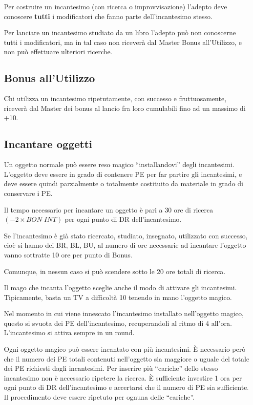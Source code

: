 Per costruire un incantesimo (con ricerca o improvvisazione) l'adepto
deve conoscere \textbf{tutti} i modificatori che fanno parte
dell'incantesimo stesso.

Per lanciare un incantesimo studiato da un libro l'adepto
pu\`o non conoscerne tutti i modificatori, ma in tal caso
non ricever\`a dal Master Bonus all'Utilizzo, e non pu\`o
effettuare ulteriori ricerche.
\fi

\subsection{Bonus all'Utilizzo}

Chi utilizza un incantesimo ripetutamente, con successo e
fruttuosamente, ricever\`a dal Master dei bonus al lancio fra loro
cumulabili fino ad un massimo di +10.


\iffullversion
\subsection{Incantare oggetti} Un
oggetto normale pu\`o essere reso magico ``installandovi'' degli
incantesimi.  L'oggetto deve essere in grado di contenere PE per far
partire gli incantesimi, e deve essere quindi parzialmente o
totalmente costituito da materiale in grado di conservare i PE.

 Il tempo necessario per incantare un oggetto \`e pari a 30 ore di
ricerca $(-2 \times BON\;INT)$ per ogni punto di DR dell'incantesimo. 

Se l'incantesimo \`e gi\`a stato ricercato, studiato, insegnato,
utilizzato con successo, cio\`e si hanno dei BR, BL, BU, al numero
di ore necessarie ad incantare l'oggetto vanno sottratte 10 ore per
punto di Bonus. 

Comunque, in nessun caso si pu\`o scendere sotto le 20 ore
totali di ricerca.

 Il mago che incanta l'oggetto sceglie anche il modo
di attivare gli incantesimi. Tipicamente, basta un TV a difficolt\`a
10 tenendo in mano l'oggetto magico. 

Nel momento in cui viene innescato l'incantesimo installato
nell'oggetto magico, questo si svuota dei PE dell'incantesimo,
recuperandoli al ritmo di 4 all'ora. L'incantesimo si attiva sempre in
un round.

Ogni oggetto magico pu\`o essere
incantato con pi\`u incantesimi. \`E necessario per\`o che il
numero dei PE totali contenuti nell'oggetto sia maggiore o uguale del
totale dei PE richiesti dagli incantesimi. Per inserire pi\`u
``cariche'' dello stesso incantesimo non \`e necessario ripetere la
ricerca.  \`E sufficiente investire 1 ora per ogni punto di DR
dell'incantesimo e accertarsi che il numero di PE sia sufficiente. Il
procedimento deve essere ripetuto per ognuna delle ``cariche''. 

